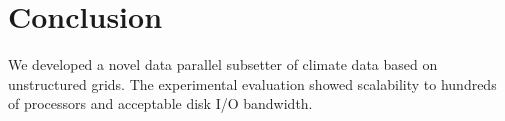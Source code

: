 \section{Conclusion}
\label{section:conclusion}

We developed a novel data parallel subsetter of climate data based on
unstructured grids.  The experimental evaluation showed scalability to
hundreds of processors and acceptable disk I/O bandwidth.
